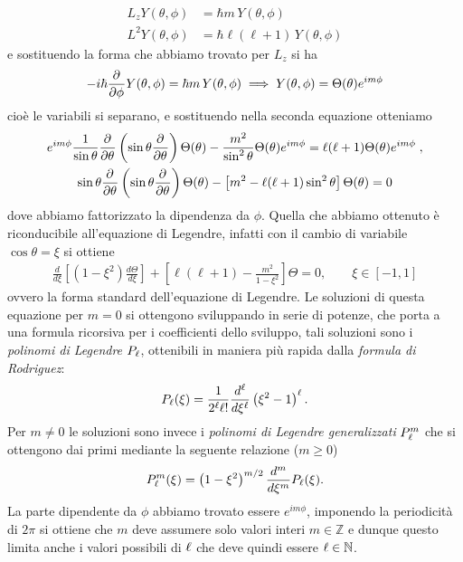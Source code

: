 \begin{align*}
  L_z Y(\theta, \phi) &= \hbar m \, Y(\theta, \phi)
  \\
  L^2 Y(\theta, \phi) &= \hbar \ell(\ell + 1) \, Y(\theta, \phi) 
\end{align*}
e sostituendo la forma che abbiamo trovato per $ L_z $ si ha
\begin{align*}
  - i \hbar \der{}{\phi} Y(\theta, \phi) = \hbar m \, Y(\theta, \phi) \implies Y(\theta, \phi) = \Theta(\theta) e^{im \phi}
\end{align*}
cioè le variabili si separano, e sostituendo nella seconda equazione otteniamo 
\begin{gather*}
  e^{im\phi} \frac1{\sin \theta} \der{}{\theta}\left(\sin\theta \der{}{\theta} \right)\Theta(\theta)-\frac{m^2}{\sin^2\theta}\Theta(\theta)e^{im\phi} 
  = \l (\l + 1) \Theta(\theta)e^{im\phi}\; ,
  \\
  \sin\theta \der{}{\theta}\left(\sin\theta \der{}{\theta} \right)\Theta(\theta)- \left[ m^2 - \l (\l + 1) \sin^2 \theta \right] \Theta(\theta) = 0
\end{gather*}
dove abbiamo fattorizzato la dipendenza da $ \phi $. Quella che abbiamo ottenuto è riconducibile all'equazione di Legendre, infatti con 
il cambio di variabile $ \cos \theta = \xi $ si ottiene 
\begin{align*}
  \frac{d}{d\xi}\!\left[(1-\xi^2)\frac{d\Theta}{d\xi}\right] + \left[\ell(\ell+1) - \frac{m^2}{1-\xi^2}\right]\Theta = 0, \qquad \xi\in[-1,1]
\end{align*}
ovvero la forma standard dell'equazione di Legendre. Le soluzioni di questa equazione per $ m = 0 $ si ottengono sviluppando in serie di potenze, che 
porta a una formula ricorsiva per i coefficienti dello sviluppo, tali soluzioni sono i \textit{polinomi di Legendre} $ P_\ell $, ottenibili 
in maniera più rapida dalla \textit{formula di Rodriguez}:
\begin{align*}
  P_\ell(\xi) = \frac1{2^\ell \ell!} \frac{d^\ell}{d\xi^\ell} \left( \xi^2 - 1 \right)^\ell.
\end{align*}
Per $ m \neq 0 $ le soluzioni sono invece i \textit{polinomi di Legendre generalizzati} $ P_\ell^m $ che si ottengono dai primi mediante la seguente 
relazione ($ m \geq 0 $) 
\begin{align*}
  P_\ell^m(\xi) = \left( 1 - \xi^2 \right)^{m/2} \frac{d^m}{d\xi^m} P_\ell(\xi).
\end{align*}
La parte dipendente da $ \phi $ abbiamo trovato essere $ e^{im\phi} $, imponendo la periodicità di $ 2\pi $ si ottiene che $ m $ deve assumere solo valori 
interi $ m \in \mathbb{Z} $ e dunque questo limita anche i valori possibili di $ \ell $ che deve quindi essere $ \ell \in \mathbb{N} $. 

